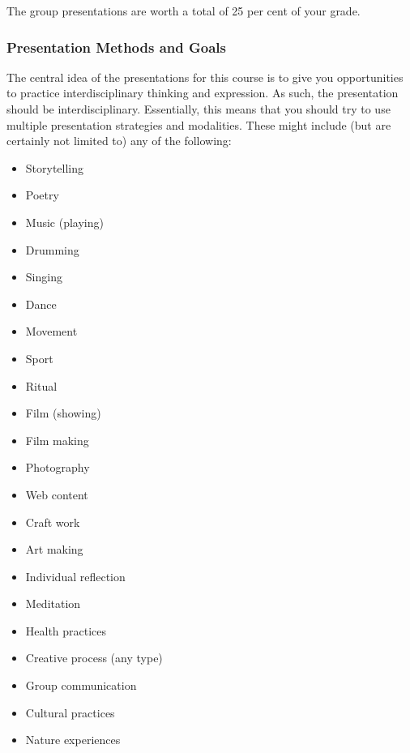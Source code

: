 \documentclass[letterpaper,10pt,headsepline]{scrreprt}
\begin{document}
The group presentations are worth a total of 25 per cent of your grade.

\subsubsection{Presentation Methods and Goals}

The central idea of the presentations for this course is to give you
 opportunities to practice interdisciplinary thinking and expression.
 As such, the presentation should be interdisciplinary. Essentially,
 this means that you should try to use multiple presentation
 strategies and modalities. These might include (but are certainly not
 limited to) any of the following:

 \begin{itemize}
 \item Storytelling
 \item Poetry
 \item Music (playing)
 \item Drumming
 \item Singing
 \item Dance
 \item Movement
 \item Sport
 \item Ritual
 \item Film (showing)
 \item Film making
 \item Photography
 \item Web content
 \item Craft work
 \item Art making
 \item Individual reflection
 \item Meditation
 \item Health practices
 \item Creative process (any type)
 \item Group communication
 \item Cultural practices
 \item Nature experiences
 \end{itemize}
\end{document}
